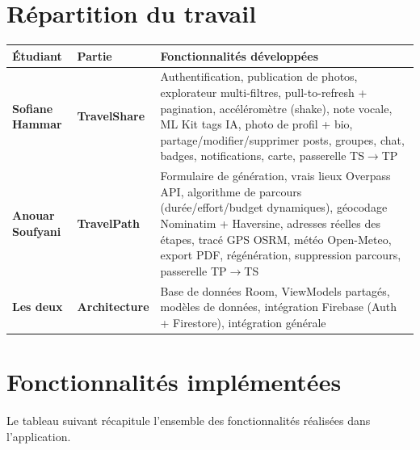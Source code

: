 \documentclass[a4paper,12pt,openany]{report}
\begin{document}
\section{Répartition du travail}

\begin{tabularx}{\textwidth}{>{\bfseries}l >{\bfseries}l X}
  \toprule
  Étudiant & Partie & Fonctionnalités développées \\
  \midrule
  Sofiane Hammar
    & TravelShare
    & Authentification, publication de photos, explorateur multi-filtres,
      pull-to-refresh + pagination, accéléromètre (shake), note vocale,
      ML Kit tags IA, photo de profil + bio, partage/modifier/supprimer posts,
      groupes, chat, badges, notifications, carte, passerelle TS$\to$TP \\[4pt]
  Anouar Soufyani
    & TravelPath
    & Formulaire de génération, vrais lieux Overpass API, algorithme de parcours
      (durée/effort/budget dynamiques), géocodage Nominatim + Haversine,
      adresses réelles des étapes, tracé GPS OSRM, météo Open-Meteo,
      export PDF, régénération, suppression parcours, passerelle TP$\to$TS \\[4pt]
  Les deux
    & Architecture
    & Base de données Room, ViewModels partagés, modèles de données, intégration
      Firebase (Auth + Firestore), intégration générale \\
  \bottomrule
\end{tabularx}


\section{Fonctionnalités implémentées}

Le tableau suivant récapitule l'ensemble des fonctionnalités réalisées dans
l'application.
\end{document}
